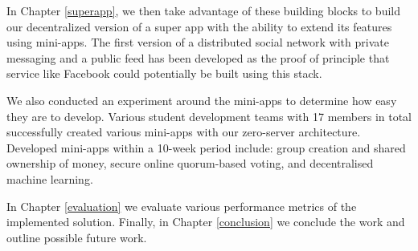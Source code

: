 In Chapter \ref{superapp}, we then take advantage of these building blocks to build our decentralized version of a super app with the ability to extend its features using mini-apps. The first version of a distributed social network with private messaging and a public feed has been developed as the proof of principle that service like Facebook could potentially be built using this stack.

We also conducted an experiment around the mini-apps to determine how easy they are to develop. Various student development teams with 17 members in total successfully created various mini-apps with our zero-server architecture. Developed mini-apps within a 10-week period include: group creation and shared ownership of money, secure online quorum-based voting, and decentralised machine learning. %

In Chapter \ref{evaluation} we evaluate various performance metrics of the implemented solution. Finally, in Chapter \ref{conclusion} we conclude the work and outline possible future work.

